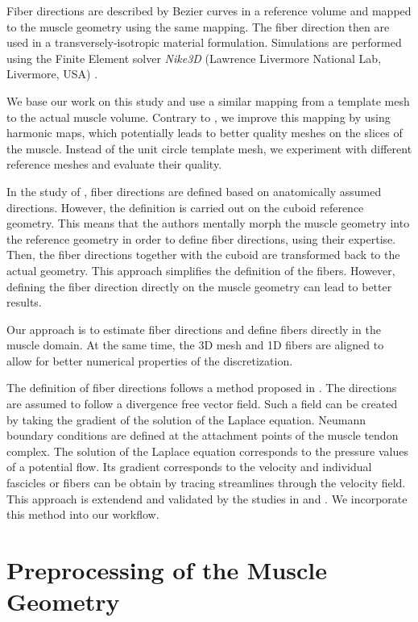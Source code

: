 Fiber directions are described by Bezier curves in a reference volume and mapped to the muscle geometry using the same mapping. The fiber direction then are used in a transversely-isotropic material formulation. Simulations are performed using the Finite Element solver \emph{Nike3D} (Lawrence Livermore National Lab, Livermore, USA) \cite{Nike3D}.

We base our work on this study and use a similar mapping from a template mesh to the actual muscle volume. Contrary to \cite{blemker2005three}, we improve this mapping by using harmonic maps, which potentially leads to better quality meshes on the slices of the muscle. Instead of the unit circle template mesh, we experiment with different reference meshes and evaluate their quality.

In the study of \cite{blemker2005three}, fiber directions are defined based on anatomically assumed directions.
However, the definition is carried out on the cuboid reference geometry. This means that the authors mentally morph the muscle geometry into the reference geometry in order to define fiber directions, using their expertise. Then, the fiber directions together with the cuboid are transformed back to the actual geometry. This approach simplifies the definition of the fibers. However, defining the fiber direction directly on the muscle geometry can lead to better results. 

Our approach is to estimate fiber directions and define fibers directly in the muscle domain. At the same time, the 3D mesh and 1D fibers are aligned to allow for better numerical properties of the discretization. 

The definition of fiber directions follows a method proposed in \cite{Choi2013}. 
The directions are assumed to follow a divergence free vector field. Such a field can be created by taking the gradient of the solution of the Laplace equation. Neumann boundary conditions are defined at the attachment points of the muscle tendon complex. The solution of the Laplace equation corresponds to the pressure values of a potential flow. Its gradient corresponds to the velocity and individual fascicles or fibers can be obtain by tracing streamlines through the velocity field.
This approach is extendend and validated by the studies in \cite{Inouye2015} and \cite{Handsfield2017}. We incorporate this method into our workflow.

\section{Preprocessing of the Muscle Geometry}

